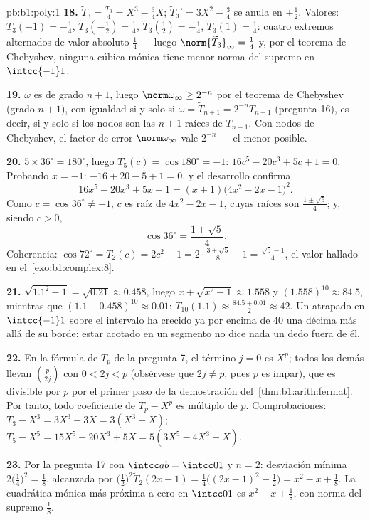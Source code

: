\begin{solution}{pb:b1:poly:1}
\textbf{18.} $\widetilde T_3 = \frac{T_3}4 = X^3 - \frac34X$;
$\widetilde T_3{}' = 3X^2 - \frac34$ se anula en $\pm\frac12$. Valores:
$\widetilde T_3(-1) = -\frac14$, $\widetilde T_3(-\tfrac12) =
\frac14$, $\widetilde T_3(\tfrac12) = -\frac14$,
$\widetilde T_3(1) = \frac14$: cuatro extremos alternados de valor
absoluto $\frac14$ --- luego $\norm{\widetilde T_3}_\infty = \frac14$
y, por el teorema de Chebyshev, ninguna cúbica mónica tiene menor
norma del supremo en $\intcc{-1}1$.

\textbf{19.} $\omega$ es  de grado $n + 1$, luego
$\norm\omega_\infty \geq 2^{-n}$ por el teorema de Chebyshev (grado
$n+1$), con igualdad si y solo si $\omega = \widetilde T_{n+1} =
2^{-n}T_{n+1}$ (pregunta 16), es decir, si y solo si los nodos son las
$n + 1$ raíces de $T_{n+1}$. Con nodos de Chebyshev, el factor de error
$\norm\omega_\infty$ vale $2^{-n}$ --- el menor posible.

\textbf{20.} $5 \times 36^\circ = 180^\circ$, luego $T_5(c) =
\cos180^\circ = -1$: $16c^5 - 20c^3 + 5c + 1 = 0$. Probando $x = -1$:
$-16 + 20 - 5 + 1 = 0$, y el desarrollo confirma
\[
16x^5 - 20x^3 + 5x + 1 = (x + 1)\bigl(4x^2 - 2x - 1\bigr)^2 .
\]
Como $c = \cos36^\circ \neq -1$, $c$ es raíz de $4x^2 - 2x - 1$, cuyas
raíces son $\frac{1 \pm \sqrt5}4$; y, siendo $c > 0$,
\[
\cos36^\circ = \frac{1 + \sqrt5}4 .
\]
Coherencia: $\cos72^\circ = T_2(c) = 2c^2 - 1 = 2\cdot\frac{3 +
\sqrt5}8 - 1 = \frac{\sqrt5 - 1}4$, el valor hallado en
el~\cref{exo:b1:complex:8}.

\textbf{21.} $\sqrt{1.1^2 - 1} = \sqrt{0.21} \approx 0.458$, luego
$x + \sqrt{x^2-1} \approx 1.558$ y $(1.558)^{10} \approx 84.5$,
mientras que $(1.1 - 0.458)^{10} \approx 0.01$: $T_{10}(1.1) \approx
\frac{84.5 + 0.01}2 \approx 42$. Un  atrapado en
$\intcc{-1}1$ sobre el intervalo ha crecido ya por encima de $40$ una
décima más allá de su borde: estar acotado en un segmento no dice nada
un dedo fuera de él.

\textbf{22.} En la fórmula de $T_p$ de la pregunta 7, el término
$j = 0$ es $X^p$; todos los demás llevan $\binom p{2j}$ con
$0 < 2j < p$ (obsérvese que $2j \neq p$, pues $p$ es impar), que es
divisible por $p$ por el primer paso de la demostración
del~\cref{thm:b1:arith:fermat}. Por tanto, todo coeficiente de
$T_p - X^p$ es múltiplo de $p$. Comprobaciones:
$T_3 - X^3 = 3X^3 - 3X = 3(X^3 - X)$;
$T_5 - X^5 = 15X^5 - 20X^3 + 5X = 5(3X^5 - 4X^3 + X)$.

\textbf{23.} Por la pregunta 17 con $\intcc ab = \intcc01$ y $n = 2$:
desviación mínima $2\bigl(\frac14\bigr)^2 = \frac18$, alcanzada por
$\bigl(\frac12\bigr)^2\widetilde T_2(2x - 1) =
\frac14\bigl((2x-1)^2 - \frac12\bigr) = x^2 - x + \frac18$. La
cuadrática mónica más próxima a cero en $\intcc01$ es
$x^2 - x + \frac18$, con norma del supremo $\frac18$.


\end{solution}
